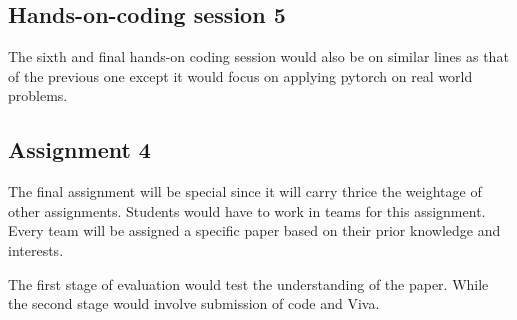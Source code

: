 \documentclass{article} %
\begin{document}
\subsection{Hands-on-coding session 5}

The sixth and final hands-on coding session would also be on similar
lines as that of the previous one except it would focus on applying
pytorch on real world problems.

\subsection{Assignment 4}

The final assignment will be special since it will carry thrice the
weightage of other assignments. Students would have to work in teams 
for this assignment. Every team will be assigned a specific paper 
based on their prior knowledge and interests.

The first stage of evaluation would test the understanding of the
paper. While the second stage would involve submission of code and Viva. 
\end{document}
